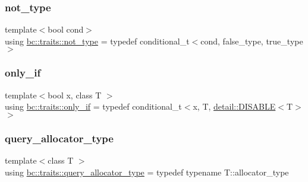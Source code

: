 \mbox{\label{namespacebc_1_1traits_a27454511d91930df60d099d9afdf46ff}} 
\subsubsection{\texorpdfstring{not\+\_\+type}{not\_type}}
{\footnotesize\ttfamily template$<$bool cond$>$ \\
using \hyperlink{namespacebc_1_1traits_a27454511d91930df60d099d9afdf46ff}{bc\+::traits\+::not\+\_\+type} = typedef conditional\+\_\+t$<$cond, false\+\_\+type, true\+\_\+type$>$}

\mbox{\label{namespacebc_1_1traits_acd61b56f095b67b85ccbe21d8bb1cd8d}} 
\subsubsection{\texorpdfstring{only\+\_\+if}{only\_if}}
{\footnotesize\ttfamily template$<$bool x, class T $>$ \\
using \hyperlink{namespacebc_1_1traits_acd61b56f095b67b85ccbe21d8bb1cd8d}{bc\+::traits\+::only\+\_\+if} = typedef conditional\+\_\+t$<$x, T, \hyperlink{structbc_1_1traits_1_1detail_1_1DISABLE}{detail\+::\+D\+I\+S\+A\+B\+LE}$<$T$>$ $>$}

\mbox{\label{namespacebc_1_1traits_ab141f0cc8348b4b7ebcb48e6bbb50d09}} 
\subsubsection{\texorpdfstring{query\+\_\+allocator\+\_\+type}{query\_allocator\_type}}
{\footnotesize\ttfamily template$<$class T $>$ \\
using \hyperlink{namespacebc_1_1traits_ab141f0cc8348b4b7ebcb48e6bbb50d09}{bc\+::traits\+::query\+\_\+allocator\+\_\+type} = typedef typename T\+::allocator\+\_\+type}

\mbox{\label{namespacebc_1_1traits_a7843a6596fe24415ac9e5eb4d804726a}} 
